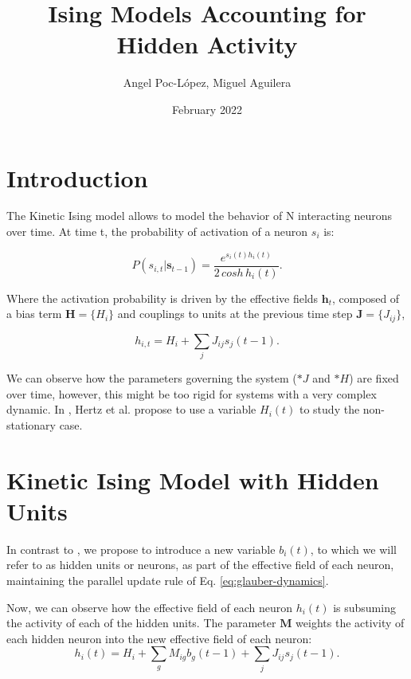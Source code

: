 \documentclass{article}
\title{Ising Models Accounting for Hidden Activity}
\author{Angel Poc-López, Miguel Aguilera}
\date{February 2022}
\def\*#1{\mathbf{#1}}
\begin{document}
\maketitle

\section{Introduction}

The Kinetic Ising model allows to model the behavior of N interacting neurons over time. At time t, the probability of activation of a neuron $s_i$ is:

\begin{equation}
    P(s_{i,t} | \*s_{t-1}) = \frac{e^{s_{i}(t) h_{i}(t) }}{2 \, cosh \, h_{i}(t)}.
    \label{eq:glauber-dynamics}
\end{equation}

Where the activation probability is driven by the effective fields $\*h_{t}$, composed of a bias term $\*H = \{H_i\}$ and couplings to units at the previous time step $\*J= \{J_{ij}\}$,

\begin{equation}
\label{eq:h1}
    h_{i,t} = H_{i} + \sum_j J_{ij}s_{j}(t-1).
\end{equation}

We can observe how the parameters governing the system ($*J$ and $*H$) are fixed over time, however, this might be too rigid for systems with a very complex dynamic.  In \cite{hertz2011ising}, Hertz et al. propose to use a variable $H_i(t)$ to study the non-stationary case. 


\section{Kinetic Ising Model with Hidden Units}

In contrast to \cite{hertz2011ising}, we propose to introduce a new variable $b_i(t)$, to which we will refer to as hidden units or neurons, as part of the effective field of each neuron, maintaining the parallel update rule of Eq. \ref{eq:glauber-dynamics}. 

Now, we can observe how the effective field of each neuron $h_i(t)$ is subsuming the activity of each of the hidden units. The parameter $\*M$ weights the activity of each hidden neuron into the new effective field of each neuron:
\begin{equation}
\label{eq:h2}
    h_{i}(t) = H_i + \sum_g M_{ig}b_g(t-1) + \sum_j J_{ij}s_{j}(t-1).
\end{equation}
\end{document}
